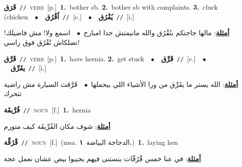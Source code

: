 \documentclass[10pt,a4paper,twoside]{article} %
\begin{document}
\begin{multicols}{2}
{\setlength\topsep{0pt}\textbf{\foreignlanguage{arabic}{قَرَق}}\ {\color{gray}\texttt{//}\color{black}}\ \textsc{verb}\ [p.]\ \textbf{1.}~bother sb.  \textbf{2.}~bother sb with complaints.  \textbf{3.}~cluck (chicken\ \ $\bullet$\ \ \setlength\topsep{0pt}\textbf{\foreignlanguage{arabic}{اُقْرُق}}\ {\color{gray}\texttt{//}\color{black}}\ [c.]\ \ $\bullet$\ \ \setlength\topsep{0pt}\textbf{\foreignlanguage{arabic}{يُقْرُق}}\ {\color{gray}\texttt{//}\color{black}}\ [i.]\  \begin{flushright}\color{gray}\foreignlanguage{arabic}{\textbf{\underline{\foreignlanguage{arabic}{أمثلة}}}: مالها جاجتكم بتُقْرُق والله مانيمتش حدا امبارح\ $\bullet$\ \  اسمع ولا! مش فاضيلك! تضلكاش تُقْرُق فوق راسي!}\end{flushright}\color{black}} \vspace{2mm}

{\setlength\topsep{0pt}\textbf{\foreignlanguage{arabic}{قَرَّق}}\ {\color{gray}\texttt{//}\color{black}}\ \textsc{verb}\ [p.]\ \textbf{1.}~have hernia.  \textbf{2.}~get stuck\ \ $\bullet$\ \ \setlength\topsep{0pt}\textbf{\foreignlanguage{arabic}{قَرِّق}}\ {\color{gray}\texttt{//}\color{black}}\ [c.]\ \ $\bullet$\ \ \setlength\topsep{0pt}\textbf{\foreignlanguage{arabic}{يقَرِّق}}\ {\color{gray}\texttt{//}\color{black}}\ [i.]\  \begin{flushright}\color{gray}\foreignlanguage{arabic}{\textbf{\underline{\foreignlanguage{arabic}{أمثلة}}}: الله يستر ما يقَرِّق من ورا الأشياء اللي بيحملها\ $\bullet$\ \  قَرَّقت السيارة مش راضية تتحرك}\end{flushright}\color{black}} \vspace{2mm}

{\setlength\topsep{0pt}\textbf{\foreignlanguage{arabic}{قُرَّيقَة}}\ {\color{gray}\texttt{//}\color{black}}\ \textsc{noun}\ [f.]\ \textbf{1.}~hernia\  \begin{flushright}\color{gray}\foreignlanguage{arabic}{\textbf{\underline{\foreignlanguage{arabic}{أمثلة}}}: شوف مكان القُرِّيقَة كيف متورم}\end{flushright}\color{black}} \vspace{2mm}

{\setlength\topsep{0pt}\textbf{\foreignlanguage{arabic}{قْرُقِّة}}\ {\color{gray}\texttt{//}\color{black}}\ \textsc{noun}\ [f.]\ \color{gray}(msa. \foreignlanguage{arabic}{الدجاجة البياضة}~\foreignlanguage{arabic}{\textbf{١.}})\color{black}\ \textbf{1.}~laying hen\  \begin{flushright}\color{gray}\foreignlanguage{arabic}{\textbf{\underline{\foreignlanguage{arabic}{أمثلة}}}: في عنا خمس قْرُقّات بنستنى فيهم يجيبوا بيض عشان نعمل عجة}\end{flushright}\color{black}} \vspace{2mm}


\end{multicols}
\end{document}

